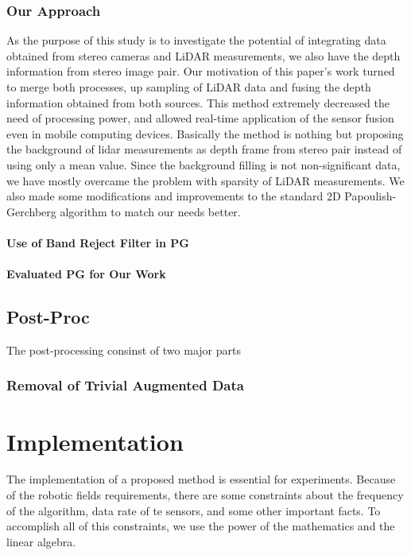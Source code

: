 \documentclass[conference]{IEEEtran}
\begin{document}
\subsubsection{Our Approach}
As the purpose of this study is to investigate the potential of integrating data obtained from stereo cameras and LiDAR measurements, we also have the depth information from stereo image pair. Our motivation of this paper's work turned to merge both processes, up sampling of LiDAR data and fusing the depth information obtained from both sources. This method extremely decreased the need of processing power, and allowed real-time application of the sensor fusion even in mobile computing devices.
Basically the method is nothing but proposing the background of lidar measurements as depth frame from stereo pair instead of using only a mean value. Since the background filling is not non-significant data, we have mostly overcame the problem with sparsity of LiDAR measurements.
We also made some modifications and improvements to the standard 2D Papoulish-Gerchberg algorithm to match our needs better.
\paragraph{Use of Band Reject Filter in PG}
\paragraph{Evaluated PG for Our Work}

\subsection{Post-Proc}

The post-processing consinst of two major parts 

\subsubsection{Removal of Trivial Augmented Data}

\section{Implementation} \label{implementation}

The implementation of a proposed method is essential for experiments. Because of the robotic fields requirements, there are some constraints about the frequency of the algorithm, data rate of te sensors, and some other important facts. To accomplish all of this constraints, we use the power of the mathematics and the linear algebra. 
\end{document}
